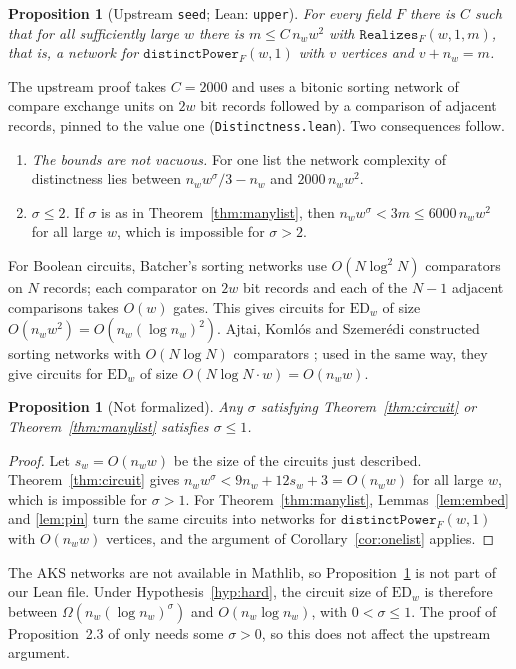 \documentclass[11pt]{amsart}
\newtheorem{proposition}[theorem]{Proposition}
\theoremstyle{definition}
\theoremstyle{remark}
\newcommand{\ED}{\mathrm{ED}}
\newcommand{\lean}[1]{\texttt{#1}}
\begin{document}
\begin{proposition}[Upstream \lean{seed}; Lean: \lean{upper}]\label{prop:upper}
For every field $F$ there is $C$ such that for all sufficiently large $w$ there is $m\le C\,n_w w^2$ with $\mathtt{Realizes}_F(w,1,m)$, that is, a network for $\mathtt{distinctPower}_F(w,1)$ with $v$ vertices and $v+n_w=m$.
\end{proposition}

The upstream proof takes $C=2000$ and uses a bitonic sorting network of compare exchange units on $2w$ bit records followed by a comparison of adjacent records, pinned to the value one (\lean{Distinctness.lean}). Two consequences follow.
\begin{enumerate}
\item \emph{The bounds are not vacuous.} For one list the network complexity of distinctness lies between $n_w w^{\sigma}/3-n_w$ and $2000\,n_w w^2$.
\item \emph{$\sigma\le 2$.} If $\sigma$ is as in Theorem~\ref{thm:manylist}, then $n_w w^{\sigma}<3m\le 6000\,n_w w^2$ for all large $w$, which is impossible for $\sigma>2$.
\end{enumerate}
For Boolean circuits, Batcher's sorting networks \cite{Batcher68} use $O(N\log^2 N)$ comparators on $N$ records; each comparator on $2w$ bit records and each of the $N-1$ adjacent comparisons takes $O(w)$ gates. This gives circuits for $\ED_w$ of size $O(n_w w^2)=O(n_w(\log n_w)^2)$. Ajtai, Koml\'os and Szemer\'edi constructed sorting networks with $O(N\log N)$ comparators \cite{AKS83}; used in the same way, they give circuits for $\ED_w$ of size $O(N\log N\cdot w)=O(n_w w)$.

\begin{proposition}[Not formalized]\label{prop:sigma1}
Any $\sigma$ satisfying Theorem~\ref{thm:circuit} or Theorem~\ref{thm:manylist} satisfies $\sigma\le 1$.
\end{proposition}
\begin{proof}
Let $s_w=O(n_w w)$ be the size of the circuits just described. Theorem~\ref{thm:circuit} gives $n_w w^{\sigma}<9n_w+12s_w+3=O(n_w w)$ for all large $w$, which is impossible for $\sigma>1$. For Theorem~\ref{thm:manylist}, Lemmas~\ref{lem:embed} and \ref{lem:pin} turn the same circuits into networks for $\mathtt{distinctPower}_F(w,1)$ with $O(n_w w)$ vertices, and the argument of Corollary~\ref{cor:onelist} applies.
\end{proof}

The AKS networks are not available in Mathlib, so Proposition~\ref{prop:sigma1} is not part of our Lean file. Under Hypothesis~\ref{hyp:hard}, the circuit size of $\ED_w$ is therefore between $\Omega(n_w(\log n_w)^{\sigma})$ and $O(n_w\log n_w)$, with $0<\sigma\le 1$. The proof of Proposition~2.3 of \cite{OAI94} only needs some $\sigma>0$, so this does not affect the upstream argument.
\end{document}

